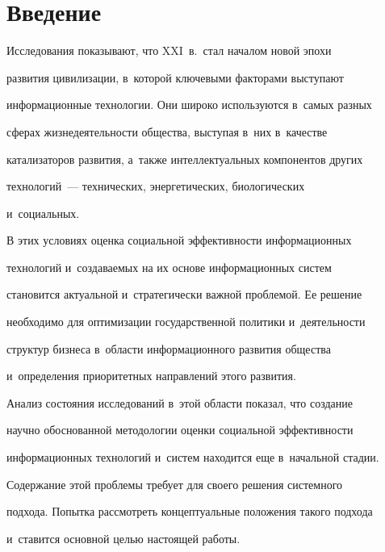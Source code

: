    \section{Введение}


   


   Исследования показывают, что XXI~в.\ стал началом новой эпохи 


развития цивилизации, в~которой ключевыми факторами вы\-сту\-па\-ют 


информационные технологии. Они широко используются в~самых разных 


сферах жизнедеятельности общества, вы\-сту\-пая в~них в~качестве 


катализаторов развития, а~так\-же интеллектуальных компонентов других 


технологий~--- технических, энергетических, био\-ло\-ги\-че\-ских 


и~социальных.


   


   В этих условиях оценка социальной эф\-фек\-тив\-ности информационных 


технологий и~соз\-да\-ва\-емых на их осно\-ве информационных сис\-тем 


становится актуальной и~стратегически важ\-ной проб\-ле\-мой. Ее решение 


необходимо для оптимизации государственной политики и~де\-я\-тель\-ности 


структур бизнеса в~об\-ласти информационного развития общества 


и~определения приоритетных на\-прав\-ле\-ний этого развития. 


   


   Анализ состояния исследований в~этой об\-ласти показал, что создание 


научно обосно\-ван\-ной методологии оценки социальной эф\-фек\-тив\-ности 


информационных технологий и~систем находится еще в~начальной стадии. 


Содержание этой проб\-ле\-мы требует для своего решения сис\-тем\-но\-го 


подхода. По\-пыт\-ка рас\-смот\-реть концептуальные положения такого подхода 


и~ставится основ\-ной \mbox{целью} на\-сто\-ящей работы. 


   


